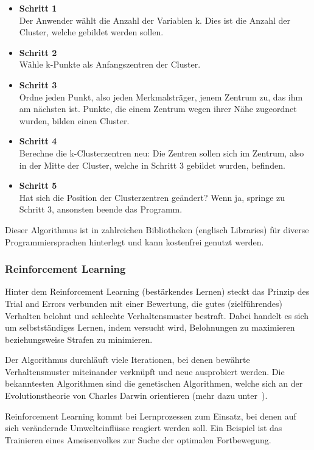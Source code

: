 \begin{itemize}
    \item \textbf{Schritt 1} \\
    Der Anwender wählt die Anzahl der Variablen k. Dies ist die Anzahl der Cluster, welche gebildet werden sollen.
    \item \textbf{Schritt 2} \\
    Wähle k-Punkte als Anfangszentren der Cluster.
    \item \textbf{Schritt 3} \\
    Ordne jeden Punkt, also jeden Merkmalsträger, jenem Zentrum zu, das ihm am nächsten ist. Punkte, die einem Zentrum
    wegen ihrer Nähe zugeordnet wurden, bilden einen Cluster.
    \item \textbf{Schritt 4} \\
    Berechne die k-Clusterzentren neu: Die Zentren sollen sich im Zentrum, also in der Mitte der Cluster, welche in
    Schritt 3 gebildet wurden, befinden.
    \item \textbf{Schritt 5} \\
    Hat sich die Position der Clusterzentren geändert? Wenn ja, springe zu Schritt 3, ansonsten beende das Programm.
\end{itemize}

Dieser Algorithmus ist in zahlreichen Bibliotheken (englisch Libraries) für diverse Programmiersprachen hinterlegt und
kann kostenfrei genutzt werden.

\subsubsection{Reinforcement Learning}
Hinter dem Reinforcement Learning (bestärkendes Lernen) steckt das Prinzip des Trial and Errors verbunden mit einer
Bewertung, die gutes (zielführendes) Verhalten belohnt und schlechte Verhaltensmuster bestraft. Dabei handelt es sich
um selbstständiges Lernen, indem versucht wird, Belohnungen zu maximieren beziehungsweise Strafen zu minimieren.

Der Algorithmus durchläuft viele Iterationen, bei denen bewährte Verhaltensmuster miteinander verknüpft und neue
ausprobiert werden. Die bekanntesten Algorithmen sind die genetischen Algorithmen, welche sich an der Evolutionstheorie
von Charles Darwin orientieren (mehr dazu unter~\cite{book_grundlagen_learnings}).

Reinforcement Learning kommt bei Lernprozessen zum Einsatz, bei denen auf sich verändernde Umwelteinflüsse reagiert
werden soll. Ein Beispiel ist das Trainieren eines Ameisenvolkes zur Suche der optimalen Fortbewegung.

